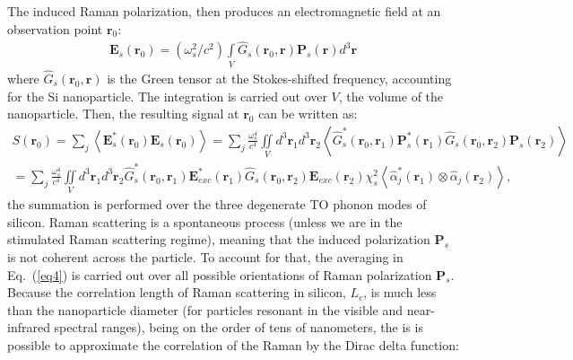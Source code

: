         The induced Raman polarization, then produces an electromagnetic field at an observation point
        $\mathbf{r}_0$:
        \begin{align}
            \mathbf{E}_s(\mathbf{r}_0) = (\omega_s^2/c^2)\int\limits_V {{{\hat G}_s}\left( {{{\mathbf{r}}_0},{\mathbf{r}}} \right){{\mathbf{P}}_s}\left( {\mathbf{r}} \right){d^3}{\mathbf{r}}}
        \end{align}
        where ${\hat G_s}\left( {{{\mathbf{r}}_0},{\mathbf{r}}} \right)$ is the Green tensor at the Stokes-shifted frequency, accounting
        for the Si nanoparticle. The integration is carried out over $V$, the volume of the nanoparticle. Then, the resulting signal at
        $\mathbf{r}_0$ can be written as:
        \begin{align} %
            S\left( {{{\mathbf{r}}_0}} \right)
                =  \sum\limits_j {\left \langle{{\mathbf{E}}_s^*\left( {{{\mathbf{r}}_0}} \right){{\mathbf{E}}_s}\left( {{{\mathbf{r}}_0}} \right)} \right\rangle}
                = \sum\limits_j {\frac{{\omega _s^4}}{{{c^4}}}\iint\limits_V {{d^3}{{\mathbf{r}}_1}{d^3}{{\mathbf{r}}_2}\left\langle {\hat G_s^*\left( {{{\mathbf{r}}_0},{{\mathbf{r}}_1}} \right){\mathbf{P}}_s^*\left( {{{\mathbf{r}}_1}} \right){{\hat G}_s}\left( {{{\mathbf{r}}_0},{{\mathbf{r}}_2}} \right){{\mathbf{P}}_s}\left( {{{\mathbf{r}}_2}} \right)} \right\rangle }}  \\
                = \sum\limits_j {\frac{{\omega _s^4}}{{{c^4}}}\iint\limits_V {{d^3}{{\mathbf{r}}_1}{d^3}{{\mathbf{r}}_2}\hat G_s^*\left( {{{\mathbf{r}}_0},{{\mathbf{r}}_1}} \right){\mathbf{E}}_{exc}^*\left( {{{\mathbf{r}}_1}} \right){{\hat G}_s}\left( {{{\mathbf{r}}_0},{{\mathbf{r}}_2}} \right){{\mathbf{E}}_{exc}}\left( {{{\mathbf{r}}_2}} \right)\chi _s^2\left\langle {\hat \alpha _j^*\left( {{{\mathbf{r}}_1}} \right) \otimes {{\hat \alpha }_j}\left( {{{\mathbf{r}}_2}} \right)} \right\rangle }},
            \label{eq4}
        \end{align}
        the summation is performed over the three degenerate TO phonon modes of silicon. Raman scattering is a spontaneous process
        (unless we are in the stimulated Raman scattering regime), meaning that the induced polarization $\mathbf{P}_s$ is not coherent across
        the particle. To account for that, the averaging in Eq.~(\ref{eq4}) is carried out over all possible orientations of Raman
        polarization $\mathbf{P}_s$. Because the correlation length of Raman scattering in silicon, $L_c$, is much less than the nanoparticle diameter
        (for particles resonant in the visible and near-infrared spectral ranges), being on the order of tens of nanometers, the is is possible to
        approximate the correlation of the Raman by the Dirac delta function:

